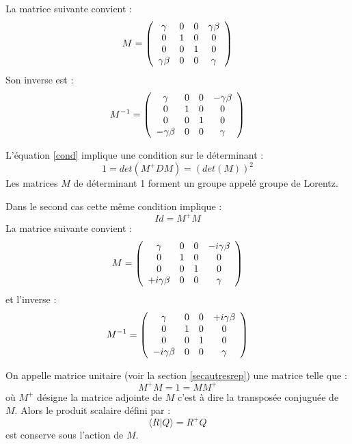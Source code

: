 \documentclass[12pt]{book}
\begin{document}
La matrice suivante convient :
\begin{equation}
M=
\left( \begin{array}{cccc}
\gamma&0&0&\gamma \beta \cr
0&1&0&0\cr
0&0&1&0\cr
\gamma \beta&0&0&\gamma\cr
         \end{array} \right)
\end{equation}
Son inverse est :
\begin{equation}
M^{-1}=
\left( \begin{array}{cccc}
\gamma&0&0&-\gamma \beta \cr
0&1&0&0\cr
0&0&1&0\cr
-\gamma \beta&0&0&\gamma\cr
          \end{array} \right)
\end{equation}
\begin{rem}
L'\'equation \ref{cond} implique une condition sur le d\'eterminant :
\begin{equation}
1=det(M^+DM)=(det(M))^2
\end{equation}
Les matrices $M$ de d\'eterminant 1 forment un groupe appel\'e groupe de
Lorentz.
 \end{rem}
Dans le second cas cette m\^eme condition implique :
\begin{equation}
Id=M^+M
\end{equation}
La matrice suivante convient :
\begin{equation}
M=
\left( \begin{array}{cccc}
\gamma&0&0&-i\gamma \beta \cr
0&1&0&0\cr
0&0&1&0\cr
+i\gamma \beta&0&0&\gamma\cr
          \end{array} \right)
\end{equation}
et l'inverse :
\begin{equation}
M^{-1}=
\left( \begin{array}{cccc}
\gamma&0&0&+i\gamma \beta \cr
0&1&0&0\cr
0&0&1&0\cr
-i\gamma \beta&0&0&\gamma\cr
\end{array} \right)          
\end{equation}
\begin{rem}
On appelle matrice unitaire (voir la section \ref{secautresrep}) une
matrice telle que : 
\begin{equation}
M^+M=1=MM^+
\end{equation}
o\`u $M^+$ d\'esigne la matrice adjointe de $M$ c'est \`a dire la
transpos\'ee conjugu\'ee de $M$. Alors le produit scalaire d\'efini par :
\begin{equation}
 \langle R|Q\rangle =R^+Q
\end{equation}
est conserve sous l'action de $M$.
\end{rem}
\end{document}
